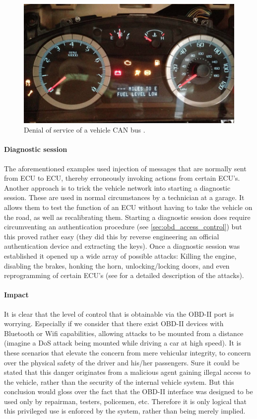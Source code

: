 \documentclass[11pt]{article}
\begin{document}
\begin{figure}[h]
	\label{fig:DoS}
	\centering
	\includegraphics[width=\textwidth]{DoS.png}
	\caption{Denial of service of a vehicle CAN bus \cite{MillerC}.}
\end{figure}

\paragraph{Diagnostic session} The aforementioned examples used injection of messages that are normally sent from ECU to ECU, thereby erroneously invoking actions from certain ECU's. Another approach is to trick the vehicle network into starting a diagnostic session. These are used in normal circumstances by a technician at a garage. It allows them to test the function of an ECU without having to take the vehicle on the road, as well as recalibrating them. Starting a diagnostic session does require circumventing an authentication procedure (see \ref{sec:obd_access_control}) but this proved rather easy (they did this by reverse engineering an official authentication device and extracting the keys). Once a diagnostic session was established it opened up a wide array of possible attacks: Killing the engine, disabling the brakes, honking the horn, unlocking/locking doors, and even reprogramming of certain ECU's (see \cite{MillerC} for a detailed description of the attacks).

\paragraph{Impact} It is clear that the level of control that is obtainable via the OBD-II port is worrying. Especially if we consider that there exist OBD-II devices with Bluetooth or Wifi capabilities, allowing attacks to be mounted from a distance (imagine a DoS attack being mounted while driving a car at high speed). It is these scenarios that elevate the concern from mere vehicular integrity, to concern over the physical safety of the driver and his/her passengers. Sure it could be stated that this danger originates from a malicious agent gaining illegal access to the vehicle, rather than the security of the internal vehicle system. But this conclusion would gloss over the fact that the OBD-II interface was designed to be used only by repairman, testers, policemen, etc. Therefore it is only logical that this privileged use is enforced by the system, rather than being merely implied.
\end{document}
